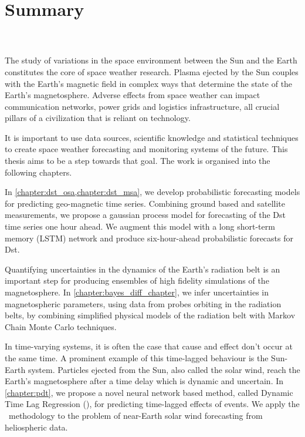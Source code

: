 \chapter*{Summary}\label{chapter:abstract}


    \textbf{\doctitle}\\
%
    \textit{\docsubtitle}\\



The study of variations in the space environment between the Sun and the Earth 
constitutes the core of space weather research. Plasma ejected by the 
Sun couples with the Earth’s magnetic field in complex ways that determine 
the state of the Earth's magnetosphere. Adverse effects from space weather can 
impact communication networks, power grids and logistics infrastructure, all 
crucial pillars of a civilization that is reliant on technology.

It is important to use data sources, scientific knowledge and statistical 
techniques to create space weather forecasting and monitoring systems of the 
future. This thesis aims to be a step towards that goal. The work is organised 
into the following chapters.

In \cref{chapter:dst_osa,chapter:dst_msa}, we develop probabilistic forecasting 
models for predicting geo-magnetic time series. Combining ground based and 
satellite measurements, we propose a gaussian process model for forecasting of 
the Dst time series one hour ahead. We augment this model with a 
long short-term memory (LSTM) network and produce six-hour-ahead probabilistic 
forecasts for Dst.

Quantifying uncertainties in the dynamics of the Earth's radiation belt is an 
important step for producing ensembles of high fidelity simulations of the 
magnetosphere. In \cref{chapter:bayes_diff_chapter}, we infer uncertainties in 
magnetospheric parameters, using data from probes orbiting in the radiation 
belts, by combining simplified physical models of the radiation belt with 
Markov Chain Monte Carlo techniques.

In time-varying systems, it is often the case that cause and effect don't occur
at the same time. A prominent example of this time-lagged behaviour is the 
Sun-Earth system. Particles ejected from the Sun, also called the solar wind, 
reach the Earth's magnetosphere after a time delay which is dynamic and 
uncertain. In \cref{chapter:pdt}, we propose a novel neural network based 
method, called Dynamic Time Lag Regression (\XX), for predicting time-lagged 
effects of events. We apply the \XX \ methodology to the problem of near-Earth 
solar wind forecasting from heliospheric data.
